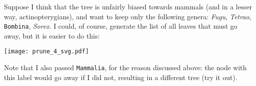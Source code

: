 Suppose I think that the tree is unfairly biased towards mammals (and in a
lesser way, actinopterygians), and want to keep only the following genera:
\textit{Fugu}, \textit{Tetrao}, \texttt{Bombina}, \textit{Sorex}. I could, of
course, generate the list of all leaves that must go away, but it is easier to
do this:


\begin{center}
\texttt{[image: prune\_4\_svg.pdf]} 
\end{center}

\noindent{}Note that I also passed \texttt{Mammalia}, for the reason discussed
above: the node with this label would go away if I did not, resulting in a
different tree (try it out).
